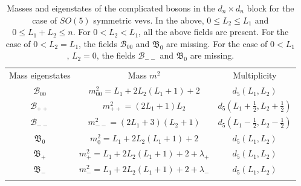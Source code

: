 \begin{table}
%
\begin{center}
%
\begingroup
\setlength{\tabcolsep}{10pt} %
\renewcommand{\arraystretch}{2.0} %
%
\begin{tabular}{ !{\vrule width 1.5pt}c!{\vrule width 1.5pt}c!{\vrule width 1.5pt}c!{\vrule width 1.5pt} }
 	Mass eigenstates & Mass $m^2$ & Multiplicity \\
 	$\mathcal{B}_{00}$ & $m^2_{00} = L_1 + 2 L_2 (L_1 + 1) + 2$ & $d_5(L_1,L_2)$ \\
 	\hline
 	$\mathcal{B}_{++}$ & $m^2_{++} = (2 L_1 + 1) L_2$ & $d_5 \left( L_1 + \tfrac{1}{2}, L_2 + \tfrac{1}{2} \right)$ \\
 	\hline
 	$\mathcal{B}_{--}$ & $m^2_{--} = (2 L_1 + 3) (L_2 + 1)$ & $d_5 \left( L_1 - \tfrac{1}{2}, L_2 - \tfrac{1}{2} \right)$ \\
 	\hline
 	$\mathfrak{B}_0$ & $m^2_0 = L_1 + 2 L_2 (L_1 + 1) + 2$ & $d_5(L_1,L_2)$ \\
 	\hline
 	$\mathfrak{B}_+$ & $m^2_+ = L_1 + 2 L_2 (L_1 + 1) + 2 + \lambda_+$ & $d_5(L_1,L_2)$ \\
 	\hline
 	$\mathfrak{B}_-$ & $m^2_- = L_1 + 2 L_2 (L_1 + 1) + 2 + \lambda_-$ & $d_5(L_1,L_2)$ \\
\end{tabular}
%
\endgroup
%
\end{center}
%
\caption[Masses and eigenstates for $SO(5)$ comp. bosons: $d_n \times d_n$ block]{Masses and eigenstates of the complicated bosons in the $d_n \times d_n$ block for the case of $SO(5)$ symmetric vevs. In the above, $0 \leq L_2 \leq L_1$ and $0 \leq L_1 + L_2 \leq n$. For $0 < L_2 < L_1$, all the above fields are present. For the case of $0 < L_2 = L_1$, the fields $\mathcal{B}_{00}$ and $\mathfrak{B}_0$ are missing. For the case of $0 < L_1$, $L_2 = 0$, the fields $\mathcal{B}_{--}$ and $\mathfrak{B}_0$ are missing.}
%
\label{tab:boson_masses_complicated_so(5)}
%
\end{table}
%
%
